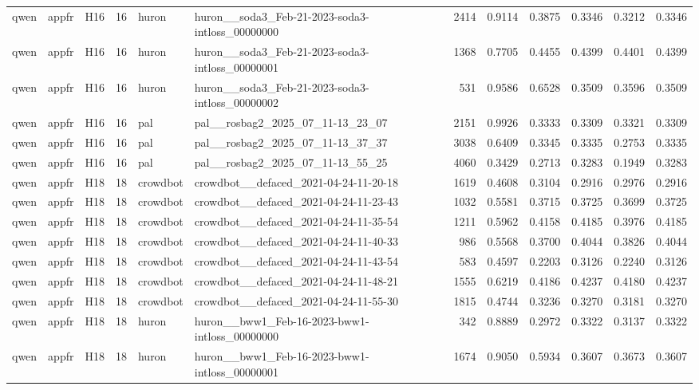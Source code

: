 \begin{table}[tbp]
\begin{tabular}{lllrllrrrrrr}
qwen & appfr & H16 & 16 & huron & huron\_\_soda3\_Feb-21-2023-soda3-intloss\_00000000 & 2414 & 0.9114 & 0.3875 & 0.3346 & 0.3212 & 0.3346 \\
qwen & appfr & H16 & 16 & huron & huron\_\_soda3\_Feb-21-2023-soda3-intloss\_00000001 & 1368 & 0.7705 & 0.4455 & 0.4399 & 0.4401 & 0.4399 \\
qwen & appfr & H16 & 16 & huron & huron\_\_soda3\_Feb-21-2023-soda3-intloss\_00000002 & 531 & 0.9586 & 0.6528 & 0.3509 & 0.3596 & 0.3509 \\
qwen & appfr & H16 & 16 & pal & pal\_\_rosbag2\_2025\_07\_11-13\_23\_07 & 2151 & 0.9926 & 0.3333 & 0.3309 & 0.3321 & 0.3309 \\
qwen & appfr & H16 & 16 & pal & pal\_\_rosbag2\_2025\_07\_11-13\_37\_37 & 3038 & 0.6409 & 0.3345 & 0.3335 & 0.2753 & 0.3335 \\
qwen & appfr & H16 & 16 & pal & pal\_\_rosbag2\_2025\_07\_11-13\_55\_25 & 4060 & 0.3429 & 0.2713 & 0.3283 & 0.1949 & 0.3283 \\
qwen & appfr & H18 & 18 & crowdbot & crowdbot\_\_defaced\_2021-04-24-11-20-18 & 1619 & 0.4608 & 0.3104 & 0.2916 & 0.2976 & 0.2916 \\
qwen & appfr & H18 & 18 & crowdbot & crowdbot\_\_defaced\_2021-04-24-11-23-43 & 1032 & 0.5581 & 0.3715 & 0.3725 & 0.3699 & 0.3725 \\
qwen & appfr & H18 & 18 & crowdbot & crowdbot\_\_defaced\_2021-04-24-11-35-54 & 1211 & 0.5962 & 0.4158 & 0.4185 & 0.3976 & 0.4185 \\
qwen & appfr & H18 & 18 & crowdbot & crowdbot\_\_defaced\_2021-04-24-11-40-33 & 986 & 0.5568 & 0.3700 & 0.4044 & 0.3826 & 0.4044 \\
qwen & appfr & H18 & 18 & crowdbot & crowdbot\_\_defaced\_2021-04-24-11-43-54 & 583 & 0.4597 & 0.2203 & 0.3126 & 0.2240 & 0.3126 \\
qwen & appfr & H18 & 18 & crowdbot & crowdbot\_\_defaced\_2021-04-24-11-48-21 & 1555 & 0.6219 & 0.4186 & 0.4237 & 0.4180 & 0.4237 \\
qwen & appfr & H18 & 18 & crowdbot & crowdbot\_\_defaced\_2021-04-24-11-55-30 & 1815 & 0.4744 & 0.3236 & 0.3270 & 0.3181 & 0.3270 \\
qwen & appfr & H18 & 18 & huron & huron\_\_bww1\_Feb-16-2023-bww1-intloss\_00000000 & 342 & 0.8889 & 0.2972 & 0.3322 & 0.3137 & 0.3322 \\
qwen & appfr & H18 & 18 & huron & huron\_\_bww1\_Feb-16-2023-bww1-intloss\_00000001 & 1674 & 0.9050 & 0.5934 & 0.3607 & 0.3673 & 0.3607 \\

\end{tabular}
\end{table}
